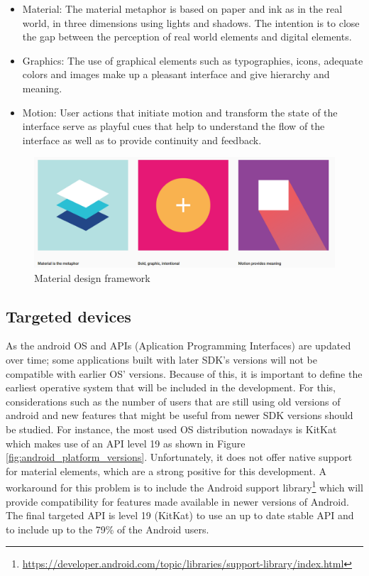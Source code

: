 \begin{itemize}
	\item Material: The material metaphor is based on paper and ink as in the real world, in three dimensions using lights and shadows. The intention is to close the gap between the perception of real world elements and digital elements. 
    \item Graphics: The use of graphical elements such as typographies, icons, adequate colors and images make up a pleasant interface and give hierarchy and meaning. 
    \item Motion: User actions that initiate motion and transform the state of the interface serve as playful cues that help to understand the flow of the interface as well as to provide continuity and feedback. 
\end{itemize}


\begin{figure}[H]
\begin{adjustbox}{width=1\textwidth,center=\textwidth}
  \centering
  \includegraphics[scale=1]{images/material_google.png}
\end{adjustbox}
  \caption[Material design framework]{Material design framework \footnotemark}
  \label{fig:android_material_design}
\end{figure}

\subsection{Targeted devices}
As the android OS and APIs (Aplication Programming Interfaces) are updated over time; some applications built with later SDK's versions will not be compatible with earlier OS' versions. Because of this, it is important to define the earliest operative system that will be included in the development. For this, considerations such as the number of users that are still using old versions of android and new features that might be useful from newer SDK versions should be studied. For instance, the most used OS distribution nowadays is KitKat which makes use of an API level 19 as shown in Figure \ref{fig:android_platform_versions}.  Unfortunately, it does not offer native support for material elements, which are a strong positive for this development. A workaround for this problem is to include the Android support library\footnote{\url{https://developer.android.com/topic/libraries/support-library/index.html}} which will provide compatibility for features made available in newer versions of Android. The final targeted API is level 19 (KitKat) to use an up to date stable API and to include up to the 79\% of the Android users.  

